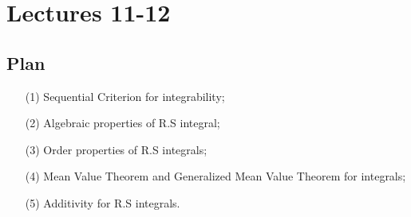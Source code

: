 \section{Lectures 11-12}

\subsection{Plan}

\begin{enumerate}
    \item[(1)] Sequential Criterion for integrability;
    \item[(2)] Algebraic properties of R.S integral;
    \item[(3)] Order properties of R.S integrals;
    \item[(4)] Mean Value Theorem and Generalized Mean Value Theorem for integrals;
    \item[(5)] Additivity for R.S integrals.
\end{enumerate}

